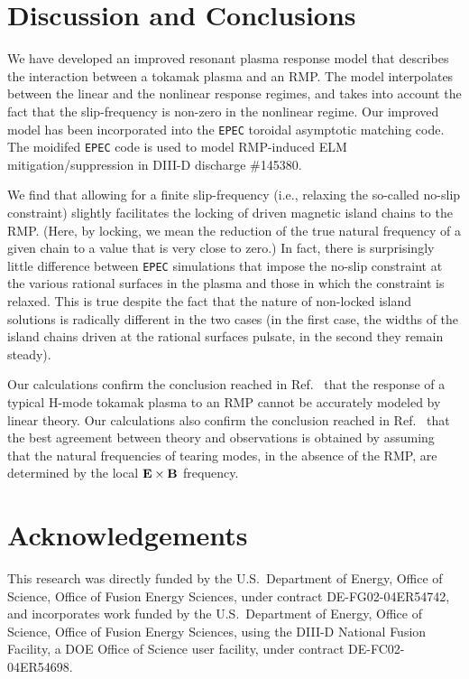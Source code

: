 \documentclass[12pt,prb,aps]{revtex4-1}
\begin{document}
\section{Discussion and Conclusions}
We have developed an improved resonant plasma response model that describes the interaction between a tokamak plasma and an RMP. 
The model interpolates between the linear and the nonlinear response regimes, and takes into account the fact that the slip-frequency
is non-zero in the nonlinear regime. Our improved model has been incorporated into the {\tt EPEC} toroidal asymptotic matching code.\cite{rftor1}
The moidifed {\tt EPEC} code is used to model RMP-induced ELM mitigation/suppression in DIII-D discharge \#145380. 

We find that allowing for a finite slip-frequency (i.e., relaxing the so-called no-slip constraint) slightly facilitates the locking of
driven magnetic island chains to the RMP. (Here, by locking, we mean the reduction of the true natural frequency of a given chain to
a value that is very close to zero.) In fact, there is surprisingly little difference between {\tt EPEC} simulations that impose the
no-slip constraint at the various rational surfaces in the plasma and those in which the constraint is relaxed. This is true despite
the fact that the nature of non-locked island solutions is radically different in the two cases (in the first case, the widths of the island
chains driven at the rational surfaces pulsate, in the second they remain steady). 

Our calculations  confirm the conclusion reached in Ref.~
that the response of a typical H-mode tokamak plasma to an RMP cannot be accurately modeled by linear theory. Our calculations also
confirm the conclusion reached in Ref.~ that the best agreement between theory and observations is obtained by assuming that the
natural frequencies of tearing modes, in the absence of the RMP, are determined by the local ${\bf E}\times{\bf B}$ frequency.

\section*{Acknowledgements}
This research was directly funded by the U.S.\ Department of Energy, Office of Science, Office of Fusion Energy Sciences,  under contract DE-FG02-04ER54742, and
incorporates work funded by the U.S.\ Department of Energy, Office of Science, Office of Fusion Energy Sciences, using the DIII-D National Fusion Facility, a DOE Office of Science user facility, under contract DE-FC02-04ER54698.  
\end{document}
